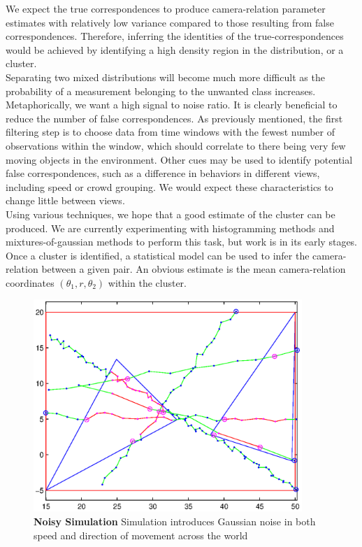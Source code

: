 \documentclass[journal]{IEEEtran}
\begin{document}
		\indent We expect the true correspondences to produce camera-relation parameter estimates with relatively low variance compared to those resulting from false correspondences. Therefore, inferring the identities of the true-correspondences would be achieved by identifying a high density region in the distribution, or a cluster. \\
		\indent Separating two mixed distributions will become much more difficult as the probability of a measurement belonging to the unwanted class increases. Metaphorically, we want a high signal to noise ratio. It is clearly beneficial to reduce the number of false correspondences. As previously mentioned, the first filtering step is to choose data from time windows with the fewest number of observations within the window, which should correlate to there being very few moving objects in the environment. Other cues may be used to identify potential false correspondences, such as a difference in behaviors in different views, including speed or crowd grouping. We would expect these characteristics to change little between views. \\
		\indent Using various techniques, we hope that a good estimate of the cluster can be produced. We are currently experimenting with histogramming methods and mixtures-of-gaussian methods to perform this task, but work is in its early stages. \\
		\indent Once a cluster is identified, a statistical model can be used to infer the camera-relation between a given pair. An obvious estimate is the mean camera-relation coordinates $(\theta_1,r,\theta_2)$ within the cluster. \\
	\begin{figure}
		\centering
		\includegraphics[width=4in]{./curvy_paths.eps}
		\caption{\textbf{Noisy Simulation} Simulation introduces Gaussian noise in both 											speed and direction of movement across the 											world}
		\label{curvy_paths}
	\end{figure}
\end{document}
